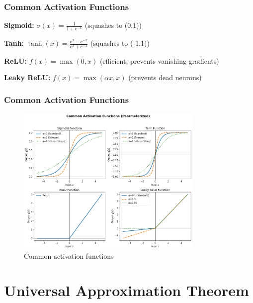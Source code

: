 \documentclass[notes]{beamer}
\begin{document}
\begin{frame}
\frametitle{Common Activation Functions}

\textbf{Sigmoid:} $\sigma(x) = \frac{1}{1 + e^{-x}}$ (squashes to (0,1))

\textbf{Tanh:} $\tanh(x) = \frac{e^x - e^{-x}}{e^x + e^{-x}}$ (squashes to (-1,1))

\textbf{ReLU:} $f(x) = \max(0, x)$ (efficient, prevents vanishing gradients)

\textbf{Leaky ReLU:} $f(x) = \max(\alpha x, x)$ (prevents dead neurons)

\href{https://kks32-courses.github.io/ut-portugal-sciml/00-mlp/relu/}{}
\end{frame}

\begin{frame}
	\frametitle{Common Activation Functions}

\begin{figure}[ht]
	\centering
	\includegraphics[width=0.8\textwidth]{figs/activation-functions.png}
	\caption*{Common activation functions}
\end{figure}

\end{frame}

\section{Universal Approximation Theorem}
\end{document}
